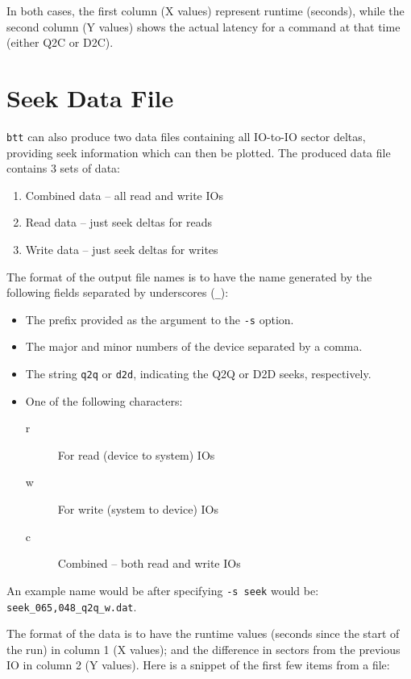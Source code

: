 \documentclass{article}
\begin{document}
  In both cases, the first column (X values) represent runtime (seconds),
  while the second column (Y values) shows the actual latency for a
  command at that time (either Q2C or D2C).

\newpage\section{\label{sec:seek}Seek Data File}

  \texttt{btt} can also produce two data files containing all IO-to-IO sector
  deltas, providing seek information which can then be plotted. The
  produced data file contains 3 sets of data:

  \begin{enumerate}
     \item Combined data -- all read and write IOs

     \item Read data -- just seek deltas for reads

     \item Write data -- just seek deltas for writes
  \end{enumerate}

  The format of the output file names is to have the name generated by
  the following fields separated by underscores (\texttt{\_}):
 
  \begin{itemize}
    \item The prefix provided as the argument to the \texttt{-s} option.
    \item The major and minor numbers of the device separated by a comma.
    \item The string \texttt{q2q} or \texttt{d2d}, indicating the Q2Q or
          D2D seeks, respectively.
    \item One of the following characters:
    	\begin{description}
	  \item[r] For read (device to system) IOs
	  \item[w] For write (system to device) IOs
	  \item[c] Combined -- both read and write IOs
	\end{description}
  \end{itemize}

  An example name would be after specifying \texttt{-s seek} would be:
  \texttt{seek\_065,048\_q2q\_w.dat}.

  The format of the data is to have the runtime values (seconds since
  the start of the run) in column 1 (X values); and the difference in
  sectors from the previous IO in column 2 (Y values). Here is a snippet
  of the first few items from a file:
\end{document}
